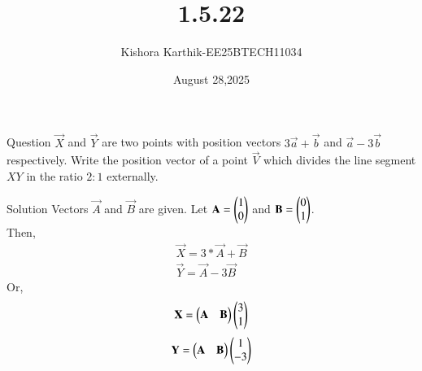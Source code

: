 \documentclass{beamer}
\begin{document}
\title 
{1.5.22}
\date{August 28,2025}


\author 
{Kishora Karthik-EE25BTECH11034}






\frame{\titlepage}
\begin{frame}{Question}
$\vec{X}$ and $\vec{Y}$ are two points with position vectors $3\vec{a} + \vec{b}$ and $\vec{a} - 3\vec{b}$ respectively. Write the position vector of a point $\vec{V}$ which divides the line segment $XY$ in the ratio $2:1$ externally. 
\end{frame}



\begin{frame}{  Solution}
Vectors $\vec{A}$ and $\vec{B}$ are given.
Let $\mathbf{A}=\begin{pmatrix}1\\0\end{pmatrix}$ and $\mathbf{B}=\begin{pmatrix}0\\1\end{pmatrix}$.\\
Then,
\begin{align}
    \vec{X}=3*\vec{A}+\vec{B}\\
    \vec{Y}=\vec{A}-3\vec{B}
\end{align}
Or,
\begin{align}
    \vec{X}=\begin{myvec}{\vec{A}& \vec{B}}\end{myvec}\begin{myvec}
        {3\\1}\end{myvec}    
\end{align}
\begin{align}
    \vec{Y}=\begin{myvec}{\vec{A}& \vec{B}}\end{myvec}\begin{myvec}
        {1\\-3}\end{myvec}    
\end{align}

\end{frame}
\end{document}
